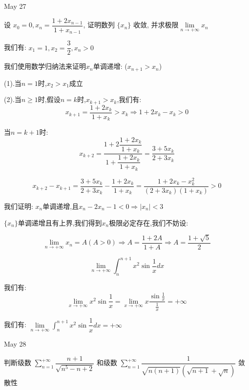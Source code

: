 \textcolor{purplea}{May 27}

\begin{example}[][Exam: 31.4.11]
	设 $x_{0}=0, x_{n}=\dfrac{1+2x_{n-1}}{1+x_{n-1}}$, 证明数列 $\{x_{n}\}$ 收敛, 并求极限$\lim\limits_{n\to +\infty}x_{n}$
\end{example}

\begin{solution}
	
	我们有: $x_{1}=1,x_{2}=\dfrac{3}{2},x_{n}>0$
	
	我们使用数学归纳法来证明$x_{n}$单调递增: ($x_{n+1}>x_{n}$)
	
	(1).当$n=1$时,$x_{2}>x_{1}$成立
	
	(2).当$n\geq 1$时,假设$n=k$时,$x_{k+1}>x_{k}$,我们有: 
	$$x_{k+1}=\dfrac{1+2x_{k}}{1+x_{k}}>x_{k}\Rightarrow 1+2x_{k}-x_{k}>0$$
	
	当$n=k+1$时: 
	$$x_{k+2}=\dfrac{1+2\dfrac{1+2x_{k}}{1+x_{k}}}{1+\dfrac{1+2x_{k}}{1+x_{k}}}=\dfrac{3+5x_{k}}{2+3x_{k}}$$
	
	$$x_{k+2}-x_{k+1}=\dfrac{3+5x_{k}}{2+3x_{k}}-\dfrac{1+2x_{k}}{1+x_{k}}=\dfrac{1+2x_{k}-x_{k}^2}{(2+3x_{k})(1+x_{k})}>0$$
	
	我们证明: $x_{n}$单调递增,且$x_{n}-2x_{n}-1<0\Rightarrow |x_{n}|<3$
	
	$\{x_{n}\}$单调递增且有上界,我们得到$x_{n}$极限必定存在,我们不妨设: 
	
	$$\lim\limits_{n\to +\infty}x_{n}=A(A>0)\Rightarrow A=\frac{1+2A}{1+A}\Rightarrow A=\dfrac{1+\sqrt{5}}{2}$$
\end{solution}

\begin{example}[][Exam: 31.4.12]
	$$\lim\limits_{n\to +\infty}\int_{n}^{n+1}x^2\sin\dfrac{1}{x}dx$$
\end{example}

\begin{solution}
	
	我们有: 
	$$\lim\limits_{x\to +\infty}x^2\sin\frac{1}{x}=\lim\limits_{x\to +\infty}x\dfrac{\sin\frac{1}{x}}{\frac{1}{x}}=+\infty$$
	
	我们有: $\lim\limits_{n\to +\infty}\int_{n}^{n+1}x^2\sin\dfrac{1}{x}dx=+\infty$
\end{solution}

\textcolor{purplea}{May 28}

\begin{example}[][Exam: 31.4.13]
	判断级数 $\sum\limits_{n=1}^{+\infty}\dfrac{n+1}{\sqrt{n^5-n+2}}$ 和级数 $\sum\limits_{n=1}^{+\infty}\dfrac{1}{\sqrt{n(n+1)}(\sqrt{n+1}+\sqrt{n})}$ 敛散性
\end{example}

